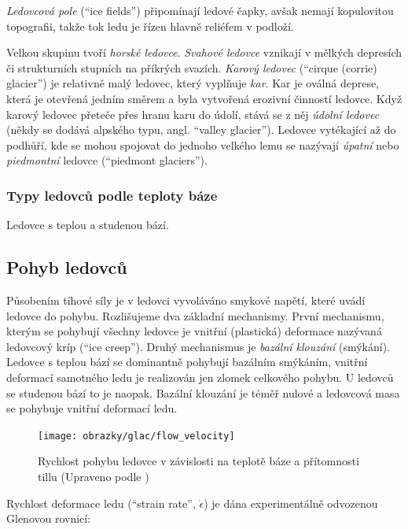\emph{Ledovcová pole} (\enquote{ice fields}) připomínají ledové čapky, avšak nemají kopulovitou topografii, takže tok ledu je řízen hlavně reliéfem v podloží.

Velkou skupinu tvoří \emph{horské ledovce}. \emph{Svahové ledovce} vznikají v mělkých depresích či strukturních stupních na příkrých svazích. \emph{Karový ledovec} (\enquote{cirque (corrie) glacier}) je relativně malý ledovec, který vyplňuje \emph{kar}. Kar je oválná deprese, která je otevřená jedním směrem a byla vytvořená erozivní činností ledovce. Když karový ledovec přeteče přes hranu karu do údolí, stává se z něj \emph{údolní ledovec} (někdy se dodává alpského typu, angl. \enquote{valley glacier}). Ledovce vytékající až do podhůří, kde se mohou spojovat do jednoho velkého lemu se nazývají \emph{úpatní} nebo \emph{piedmontní} ledovce (\enquote{piedmont glaciers}).

\subsubsection{Typy ledovců podle teploty báze}
Ledovce s teplou a studenou bází.

\subsection{Pohyb ledovců}
Působením tíhové síly je v ledovci vyvoláváno smykové napětí, které uvádí ledovce do pohybu. Rozlišujeme dva základní mechanismy. První mechanismu, kterým se pohybují všechny ledovce je vnitřní (plastická) deformace nazývaná ledovcový kríp (\enquote{ice creep}). Druhý mechanismus je \emph{bazální klouzání} (smýkání). Ledovce s teplou bází se dominantně pohybují bazálním smýkáním, vnitřní deformací samotného ledu je realizován jen zlomek celkového pohybu. U ledovců se studenou bází to je naopak. Bazální klouzání je téměř nulové a ledovcová masa se pohybuje vnitřní deformací ledu. 

\begin{figure}
	\centering
	\texttt{[image: obrazky/glac/flow\_velocity]}
	\caption{Rychlost pohybu ledovce v závislosti na teplotě báze a přítomnosti tillu (Upraveno podle \textcite{biermanKeyConceptsGeomorphology2014})}
	\label{fig:flowvelocity}
\end{figure}




Rychlost deformace ledu (\enquote{strain rate}, $\dot{\epsilon}$) je dána experimentálně odvozenou Glenovou rovnicí:

